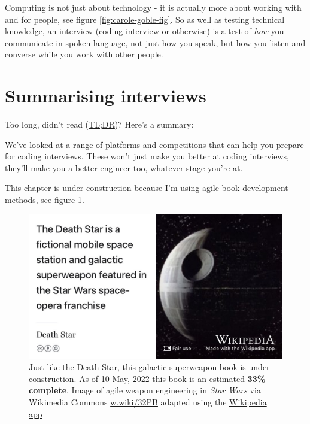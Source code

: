 \documentclass[
]{book}
\begin{document}
Computing is not just about technology - it is actually more about working with and for people, see figure \ref{fig:carole-goble-fig}. So as well as testing technical knowledge, an interview (coding interview or otherwise) is a test of \emph{how} you communicate in spoken language, not just how you speak, but how you listen and converse while you work with other people. \citep{frengoble}

\hypertarget{tldr9}{%
\section{Summarising interviews}\label{tldr9}}

Too long, didn't read (\href{https://en.wiktionary.org/wiki/too_long;_didn\%27t_read}{TL;DR})? Here's a summary:

We've looked at a range of platforms and competitions that can help you prepare for coding interviews. These won't just make you better at coding interviews, they'll make you a better engineer too, whatever stage you're at.

This chapter is under construction because I'm using agile book development methods, see figure \ref{fig:deathstar6-fig}.

\begin{figure}

{\centering \includegraphics[width=0.99\linewidth]{images/DeathStar2} 

}

\caption{Just like the \href{https://en.wikipedia.org/wiki/Death_Star}{Death Star}, this \sout{galactic superweapon} book is under construction. As of 10 May, 2022 this book is an estimated \textbf{33\% complete}. Image of agile weapon engineering in \emph{Star Wars} via Wikimedia Commons \href{https://w.wiki/32PB}{w.wiki/32PB} adapted using the \href{https://apps.apple.com/gb/app/wikipedia/id324715238}{Wikipedia app}}\label{fig:deathstar6-fig}
\end{figure}
\end{document}
